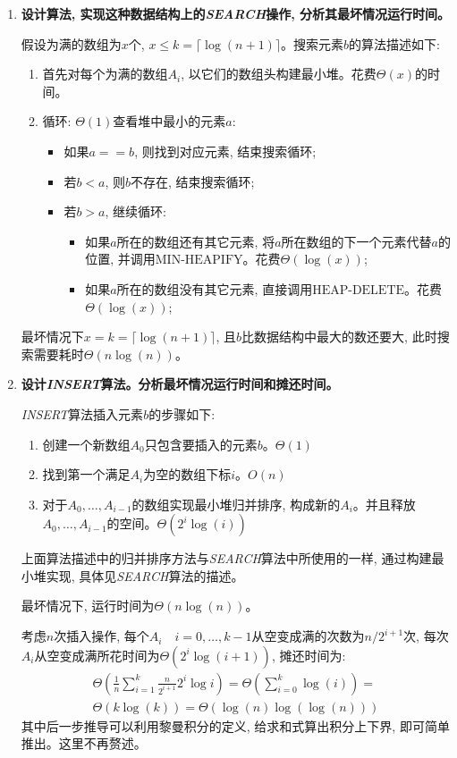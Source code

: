 \documentclass[paper=a4, fontsize=11pt]{scrartcl} %
\numberwithin{equation}{section} %
\numberwithin{figure}{section} %
\numberwithin{table}{section} %
\begin{document}
\begin{enumerate}[a]
\item \textbf{设计算法, 实现这种数据结构上的\textit{SEARCH}操作, 分析其最坏情况运行时间。}

  假设为满的数组为$x$个, $x \leq k = \lceil \log(n+1) \rceil$。搜索元素$b$的算法描述如下:
  \begin{enumerate}
  \item 首先对每个为满的数组$A_i$, 以它们的数组头构建最小堆。花费$\Theta(x)$的时间。
  \item 循环: $\Theta(1)$查看堆中最小的元素$a$:
    \begin{itemize}
    \item 如果$a == b$, 则找到对应元素, 结束搜索循环;
    \item 若$b < a$, 则$b$不存在, 结束搜索循环;
    \item 若$b > a$, 继续循环:
      \begin{itemize}
      \item 如果$a$所在的数组还有其它元素, 将$a$所在数组的下一个元素代替$a$的位置, 并调用$\mbox{MIN-HEAPIFY}$。花费$\Theta(\log(x))$;
      \item 如果$a$所在的数组没有其它元素, 直接调用$\mbox{HEAP-DELETE}$。花费$\Theta(\log(x))$;
      \end{itemize}
    \end{itemize}
  \end{enumerate}
  最坏情况下$x = k = \lceil \log(n+1) \rceil$, 且$b$比数据结构中最大的数还要大, 此时搜索需要耗时$\Theta(n \log(n))$。

\item \textbf{设计\textit{INSERT}算法。分析最坏情况运行时间和摊还时间。}

  \textit{INSERT}算法插入元素$b$的步骤如下:
  \begin{enumerate}
  \item 创建一个新数组$A_0$只包含要插入的元素$b$。$\Theta(1)$
  \item 找到第一个满足$A_i$为空的数组下标$i$。$O(n)$
  \item 对于$A_0, \dots, A_{i-1}$的数组实现最小堆归并排序, 构成新的$A_{i}$。并且释放$A_0, \dots, A_{i-1}$的空间。$\Theta(2^i\log(i))$
  \end{enumerate}

  上面算法描述中的归并排序方法与\textit{SEARCH}算法中所使用的一样, 通过构建最小堆实现, 具体见\textit{SEARCH}算法的描述。

  最坏情况下, 运行时间为$\Theta(n\log(n))$。

  考虑$n$次插入操作, 每个$A_i \quad i = 0, \dots, k-1$从空变成满的次数为$n/2^{i+1}$次, 每次$A_i$从空变成满所花时间为$\Theta(2^i\log(i+1))$, 摊还时间为:
  \[
  \begin{split}
    \Theta(\frac{1}{n}\displaystyle\sum_{i=1}^{k} \frac{n}{2^{i+1}} 2^i \log{i}) = \Theta(\displaystyle\sum_{i=0}^{k} \log(i)) = \\
    \Theta(k\log(k)) = \Theta(\log(n)\log(\log(n)))
  \end{split}
  \]
  其中后一步推导可以利用黎曼积分的定义, 给求和式算出积分上下界, 即可简单推出。这里不再赘述。


\end{enumerate}
\end{document}

